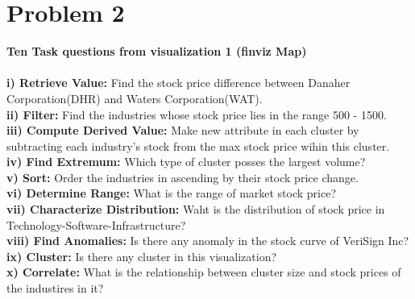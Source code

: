 \documentclass{article}
\begin{document}
\section{Problem 2}

\textbf{\hspace{12mm}Ten Task questions from visualization 1 (finviz Map)}\\\\
\textbf{i) Retrieve Value:} Find the stock price difference between Danaher Corporation(DHR) and Waters Corporation(WAT).\\
\textbf{ii) Filter:} Find the industries whose stock price lies in the range 500 - 1500.\\
\textbf{iii) Compute Derived Value:} Make new attribute in each cluster by subtracting each industry's stock from the max stock price wihin this cluster.\\
\textbf{iv) Find Extremum:} Which type of cluster posses the largest volume?\\
\textbf{v) Sort:} Order the industries in ascending by their stock price change. \\
\textbf{vi) Determine Range:} What is the range of market stock price?\\
\textbf{vii) Characterize Distribution:} Waht is the distribution of stock price in Technology-Software-Infrastructure?\\
\textbf{viii) Find Anomalies:} Is there any anomaly in the stock curve of VeriSign Inc?\\
\textbf{ix) Cluster:} Is there any cluster in this visualization?\\
\textbf{x) Correlate:} What is the relationship between cluster size and stock prices of the industires in it?\\
\end{document}

